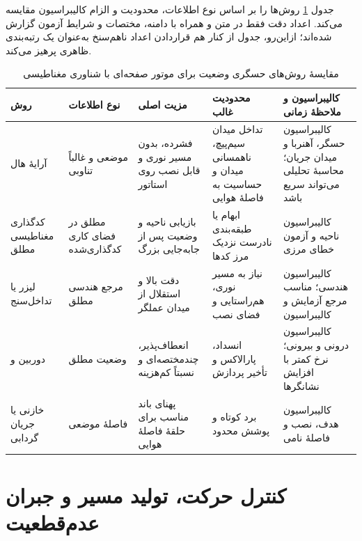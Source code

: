 جدول \ref{tab:sensing-comparison} روش‌ها را بر اساس نوع اطلاعات، محدودیت و الزام کالیبراسیون مقایسه می‌کند. اعداد دقت فقط در متن و همراه با دامنه، مختصات و شرایط آزمون گزارش شده‌اند؛ ازاین‌رو، جدول از کنار هم قراردادن اعداد ناهم‌سنخ به‌عنوان یک رتبه‌بندی ظاهری پرهیز می‌کند.

\begin{table}[htbp]
	\centering
	\caption{مقایسهٔ روش‌های حسگری وضعیت برای موتور صفحه‌ای با شناوری مغناطیسی}
	\label{tab:sensing-comparison}
	\renewcommand{\arraystretch}{1.24}
	\setlength{\tabcolsep}{3pt}
	\scriptsize
	\begin{tabular}{|p{}|p{}|p{}|p{}|p{}|}
		\hline
		\textbf{روش} & \textbf{نوع اطلاعات} & \textbf{مزیت اصلی} & \textbf{محدودیت غالب} & \textbf{کالیبراسیون و ملاحظهٔ زمانی} \\
		\hline
		آرایهٔ هال & موضعی و غالباً تناوبی & فشرده، بدون مسیر نوری و قابل نصب روی استاتور & تداخل میدان سیم‌پیچ، ناهمسانی میدان و حساسیت به فاصلهٔ هوایی & کالیبراسیون حسگر، آهنربا و میدان جریان؛ محاسبهٔ تحلیلی می‌تواند سریع باشد \cite{wangHallArrayBasedPositionPosture2026d} \\
		\hline
		کدگذاری مغناطیسی مطلق & مطلق در فضای کاری کدگذاری‌شده & بازیابی ناحیه و وضعیت پس از جابه‌جایی بزرگ & ابهام یا طبقه‌بندی نادرست نزدیک مرز کدها & کالیبراسیون ناحیه و آزمون خطای مرزی \cite{zhangLongrange6DOFAbsolute2024} \\
		\hline
		لیزر یا تداخل‌سنج & مرجع هندسی مطلق & دقت بالا و استقلال از میدان عملگر & نیاز به مسیر نوری، هم‌راستایی و فضای نصب & کالیبراسیون هندسی؛ مناسب مرجع آزمایش و کالیبراسیون \\
		\hline
		دوربین و \lr{AprilTag} & وضعیت مطلق & انعطاف‌پذیر، چندمختصه‌ای و نسبتاً کم‌هزینه & انسداد، پارالاکس و تأخیر پردازش & کالیبراسیون درونی و بیرونی؛ نرخ کمتر با افزایش نشانگرها \cite{wangAprilTag2Efficient2016,miyasakaMagneticLevitationUnlimited2014} \\
		\hline
		خازنی یا جریان گردابی & فاصلهٔ موضعی & پهنای باند مناسب برای حلقهٔ فاصلهٔ هوایی & برد کوتاه و پوشش محدود & کالیبراسیون هدف، نصب و فاصلهٔ نامی \\
		\hline
	\end{tabular}
\end{table}


\section{کنترل حرکت، تولید مسیر و جبران عدم‌قطعیت}
\label{sec:motion-control-trajectory-performance}

